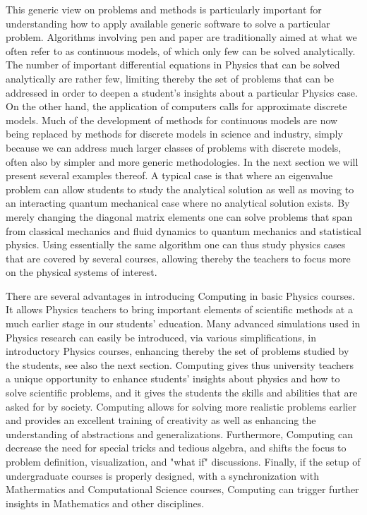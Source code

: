 \documentclass[graybox,envcountchap,sectrefs]{svmult}
\begin{document}
This generic view on problems and methods is particularly important for
understanding how to apply available generic software to solve a
particular problem.  Algorithms involving pen and paper are
traditionally aimed at what we often refer to as continuous models, of
which only few can be solved analytically. The number of important
differential equations in Physics that can be solved analytically are
rather few, limiting thereby the set of problems that can be addressed
in order to deepen a student's insights about a particular Physics
case. On the other hand, the application of computers calls for
approximate discrete models.  Much of the development of methods for
continuous models are now being replaced by methods for discrete
models in science and industry, simply because we can address much
larger classes of problems with discrete models, often also by simpler
and more generic methodologies.  In the next section we will present
several examples thereof. A typical case is that where an eigenvalue
problem can allow students to study the analytical solution as well as
moving to an interacting quantum mechanical case where no analytical
solution exists. By merely changing the diagonal matrix elements one
can solve problems that span from classical mechanics and fluid
dynamics to quantum mechanics and statistical physics.  Using
essentially the same algorithm one can thus study physics cases that
are covered by several courses, allowing thereby the teachers to focus
more on the physical systems of interest.

There are several advantages in  introducing Computing in basic Physics
courses. It allows Physics teachers to bring important elements of
scientific methods at a much earlier stage in our students'
education. Many advanced simulations used in Physics research can
easily be introduced, via various simplifications, in introductory
Physics courses, enhancing thereby the set of problems studied by the
students, see also the next section. Computing gives thus university
teachers a unique opportunity to enhance students' insights about
physics and how to solve scientific problems, and it gives the
students the skills and abilities that are asked for by
society. Computing allows for solving more realistic problems earlier
and provides an excellent training of creativity as well as enhancing the
understanding of abstractions and generalizations. Furthermore,
Computing can decrease the need for special tricks and tedious
algebra, and shifts the focus to problem definition, visualization,
and "what if" discussions. Finally, if the setup of undergraduate
courses is properly designed, with a synchronization with Mathermatics
and Computational Science courses, Computing can trigger further
insights in Mathematics and other disciplines. 
\end{document}

